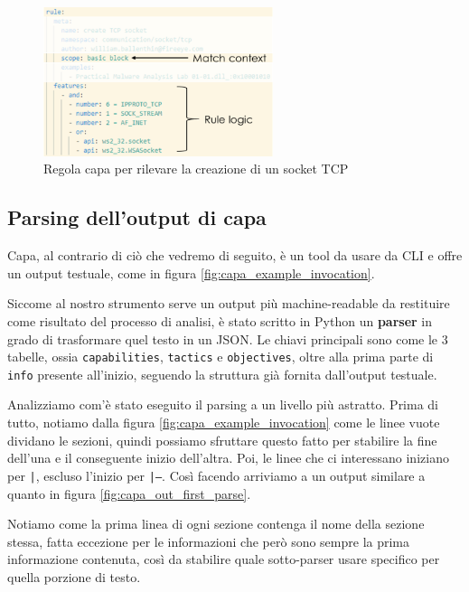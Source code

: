 \begin{figure}[!htb]
    \centering
    \includegraphics[width=0.6\textwidth]{assets/capa_example_rule.png}
    \caption{Regola capa per rilevare la creazione di un socket TCP}
    \label{fig:capa_rule_socket_tcp}
\end{figure}

\subsection{Parsing dell'output di capa}
Capa, al contrario di ciò che vedremo di seguito, è un tool da usare da CLI e offre un output testuale, come in figura \ref{fig:capa_example_invocation}.

Siccome al nostro strumento serve un output più machine-readable da restituire come risultato del processo di analisi, è stato scritto in Python un \textbf{parser} in grado di trasformare quel testo in un JSON.
Le chiavi principali sono come le 3 tabelle, ossia \texttt{capabilities}, \texttt{tactics} e \texttt{objectives}, oltre alla prima parte di \texttt{info} presente all'inizio, seguendo la struttura già fornita dall'output testuale.

Analizziamo com'è stato eseguito il parsing a un livello più astratto.
Prima di tutto, notiamo dalla figura \ref{fig:capa_example_invocation} come le linee vuote dividano le sezioni, quindi possiamo sfruttare questo fatto per stabilire la fine dell'una e il conseguente inizio dell'altra.
Poi, le linee che ci interessano iniziano per \texttt{|}, escluso l'inizio per \texttt{|---}. Così facendo arriviamo a un output similare a quanto in figura \ref{fig:capa_out_first_parse}.

Notiamo come la prima linea di ogni sezione contenga il nome della sezione stessa, fatta eccezione per le informazioni che però sono sempre la prima informazione contenuta, così da stabilire quale sotto-parser usare specifico per quella porzione di testo.


